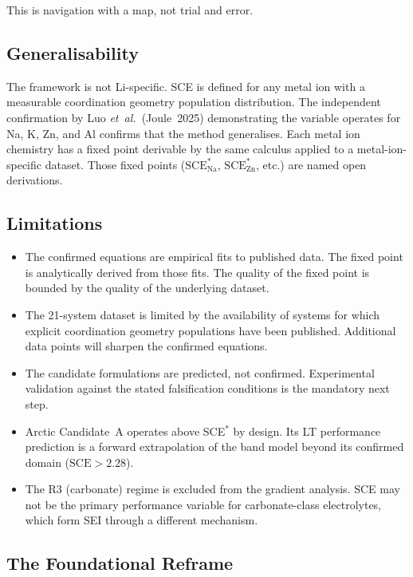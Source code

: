 \documentclass[11pt]{article}
\theoremstyle{plain}
\theoremstyle{definition}
\theoremstyle{remark}
\begin{document}
This is navigation with a map, not trial and error.

\subsection{Generalisability}

The framework is not Li-specific.  SCE is defined for any metal ion with a
measurable coordination geometry population distribution.  The independent
confirmation by Luo \textit{et~al.}\ (Joule~2025) demonstrating the variable
operates for Na, K, Zn, and Al \cite{Luo2025} confirms that the method
generalises.  Each metal ion chemistry has a fixed point derivable by the same
calculus applied to a metal-ion-specific dataset.  Those fixed points
($\mathrm{SCE}^{*}_{\mathrm{Na}}$, $\mathrm{SCE}^{*}_{\mathrm{Zn}}$, etc.)
are named open derivations.

\subsection{Limitations}

\begin{itemize}[leftmargin=2em]
  \item The confirmed equations are empirical fits to published data.
        The fixed point is analytically derived from those fits.
        The quality of the fixed point is bounded by the quality of
        the underlying dataset.
  \item The 21-system dataset is limited by the availability of systems
        for which explicit coordination geometry populations have been
        published.  Additional data points will sharpen the confirmed equations.
  \item The candidate formulations are predicted, not confirmed.
        Experimental validation against the stated falsification conditions
        is the mandatory next step.
  \item Arctic Candidate~A operates above SCE$^{*}$ by design.
        Its LT performance prediction is a forward extrapolation of the
        band model beyond its confirmed domain ($\mathrm{SCE} > 2.28$).
  \item The R3 (carbonate) regime is excluded from the gradient analysis.
        SCE may not be the primary performance variable for carbonate-class
        electrolytes, which form SEI through a different mechanism.
\end{itemize}

\subsection{The Foundational Reframe}
\end{document}
